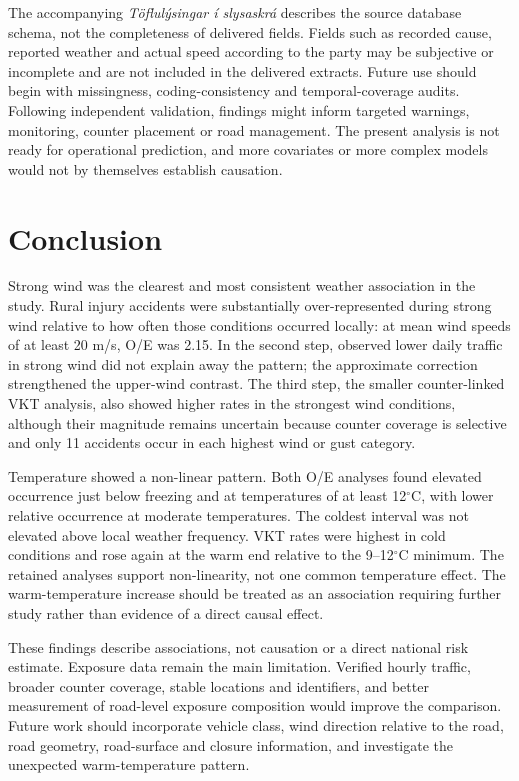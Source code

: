 The accompanying \emph{Töflulýsingar í slysaskrá} describes the source database schema, not the completeness of delivered fields. Fields such as recorded cause, reported weather and actual speed according to the party may be subjective or incomplete and are not included in the delivered extracts. Future use should begin with missingness, coding-consistency and temporal-coverage audits. Following independent validation, findings might inform targeted warnings, monitoring, counter placement or road management. The present analysis is not ready for operational prediction, and more covariates or more complex models would not by themselves establish causation.

\chapter{Conclusion}

Strong wind was the clearest and most consistent weather association in the study. Rural injury accidents were substantially over-represented during strong wind relative to how often those conditions occurred locally: at mean wind speeds of at least 20 m/s, O/E was 2.15. In the second step, observed lower daily traffic in strong wind did not explain away the pattern; the approximate correction strengthened the upper-wind contrast. The third step, the smaller counter-linked VKT analysis, also showed higher rates in the strongest wind conditions, although their magnitude remains uncertain because counter coverage is selective and only 11 accidents occur in each highest wind or gust category.

Temperature showed a non-linear pattern. Both O/E analyses found elevated occurrence just below freezing and at temperatures of at least 12$^{\circ}$C, with lower relative occurrence at moderate temperatures. The coldest interval was not elevated above local weather frequency. VKT rates were highest in cold conditions and rose again at the warm end relative to the 9--12$^{\circ}$C minimum. The retained analyses support non-linearity, not one common temperature effect. The warm-temperature increase should be treated as an association requiring further study rather than evidence of a direct causal effect.

These findings describe associations, not causation or a direct national risk estimate. Exposure data remain the main limitation. Verified hourly traffic, broader counter coverage, stable locations and identifiers, and better measurement of road-level exposure composition would improve the comparison. Future work should incorporate vehicle class, wind direction relative to the road, road geometry, road-surface and closure information, and investigate the unexpected warm-temperature pattern.

